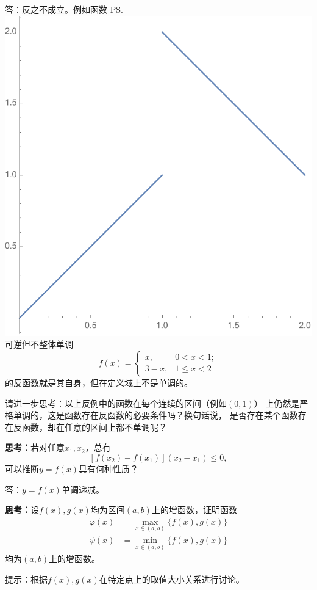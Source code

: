 \ifhint
答：反之不成立。例如函数
\ps{\centering
\includegraphics[width=0.9\marginparwidth]{./images/ch01/pswsRef.pdf}\\
可逆但不整体单调}
$$f(x)=\left\{\begin{array}{ll}
	x,&0<x<1;\\
	3-x,&1\leq x<2
\end{array}\right.$$
的反函数就是其自身，但在定义域上不是单调的。\fin

请进一步思考：以上反例中的函数在每个连续的区间（例如$(0,1)$）
上仍然是严格单调的，这是函数存在反函数的必要条件吗？换句话说，
是否存在某个函数存在反函数，却在任意的区间上都不单调呢？
\fi

\bs
{\bf 思考：}若对任意$x_1,x_2$，总有
$$[f(x_2)-f(x_1)](x_2-x_1)\leq 0,$$
可以推断$y=f(x)$具有何种性质？

\ifhint
答：$y=f(x)$单调递减。
\fi

\bs
{\bf 思考：}设$f(x),g(x)$均为区间$(a,b)$上的增函数，证明函数
\begin{align*}
	\varphi(x)&=\max_{x\in(a,b)}\{f(x),g(x)\}\\
	\psi(x)&=\min_{x\in(a,b)}\{f(x),g(x)\}
\end{align*}
均为$(a,b)$上的增函数。

\ifhint
提示：根据$f(x),g(x)$在特定点上的取值大小关系进行讨论。

